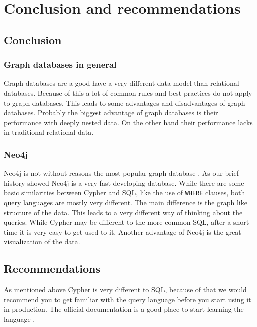 \section{Conclusion and recommendations}
\subsection{Conclusion}
\subsubsection{Graph databases in general}
Graph databases are a good have a very different data model than relational
databases. Because of this a lot of common rules and best practices do not apply
to graph databases. This leads to some advantages and disadvantages of graph
databases. Probably the biggest advantage of graph databases is their
performance with deeply nested data. On the other hand their performance lacks
in traditional relational data.

\subsubsection{Neo4j}
Neo4j is not without reasons the most popular graph database
\parencite{db-engines}. As our brief history showed
Neo4j is a very fast developing database. While there are some basic
similarities between Cypher and SQL, like the use of \texttt{WHERE} clauses,
both query languages are mostly very different. The main difference is the graph
like structure of the data. This leads to a very different way of thinking about
the queries. While Cypher may be different to the more common SQL, after a short
time it is very easy to get used to it. Another advantage of Neo4j is the great
visualization of the data.

\subsection{Recommendations}
As mentioned above Cypher is very different to SQL, because of that we would
recommend you to get familiar with the query language before you start using it
in production. The official documentation is a good place to start learning the
language \parencite{neo4j:cypher-manual}.

